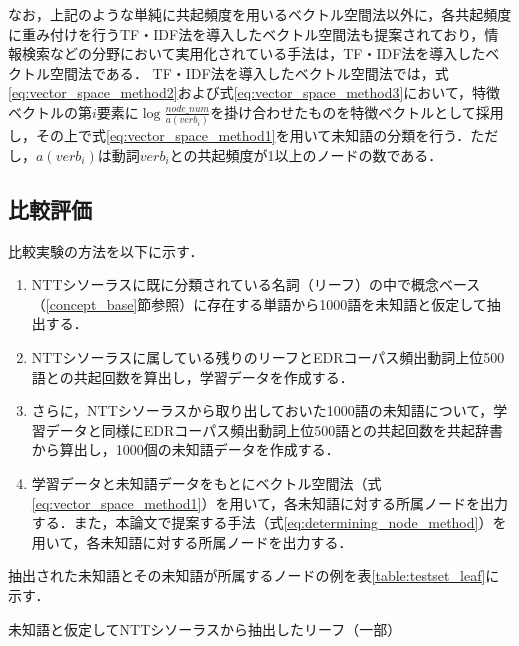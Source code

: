 \documentclass[japanese]{jnlp_1.4}
\begin{document}
なお，上記のような単純に共起頻度を用いるベクトル空間法以外に，各共起頻度に重み付けを行うTF・IDF法を導入したベクトル空間法も提案されており，情報検索などの分野において実用化されている手法は，TF・IDF法を導入したベクトル空間法である\cite{witten:99}．
TF・IDF法を導入したベクトル空間法では，式\ref{eq:vector_space_method2}および式\ref{eq:vector_space_method3}において，特徴ベクトルの第$i$要素に$\log\frac{\mathit{node}\_\mathit{num}}{a(\mathit{verb}_i)}$を掛け合わせたものを特徴ベクトルとして採用し，その上で式\ref{eq:vector_space_method1}を用いて未知語の分類を行う．ただし，$a(\mathit{verb}_i)$は動詞$\mathit{verb}_i$との共起頻度が1以上のノードの数である．


\subsection{比較評価}\label{comparison_with_related research}

比較実験の方法を以下に示す\cite{maeda:00}．
\begin{enumerate}

\item NTTシソーラスに既に分類されている名詞（リーフ）の中で概念ベース（\ref{concept_base}節参照）に存在する単語から1000語を未知語と仮定して抽出する．

\item NTTシソーラスに属している残りのリーフとEDRコーパス頻出動詞上位500語との共起回数を算出し，学習データを作成する．

\item さらに，NTTシソーラスから取り出しておいた1000語の未知語について，学習データと同様にEDRコーパス頻出動詞上位500語との共起回数を共起辞書から算出し，1000個の未知語データを作成する．

\item 学習データと未知語データをもとにベクトル空間法（式\ref{eq:vector_space_method1}）を用いて，各未知語に対する所属ノードを出力する．また，本論文で提案する手法（式\ref{eq:determining_node_method}）を用いて，各未知語に対する所属ノードを出力する．

\end{enumerate}

抽出された未知語とその未知語が所属するノードの例を表\ref{table:testset_leaf}に示す．


\begin{table}[b]
\caption{未知語と仮定してNTTシソーラスから抽出したリーフ（一部）}

\label{table:testset_leaf}
\end{table}
\end{document}

